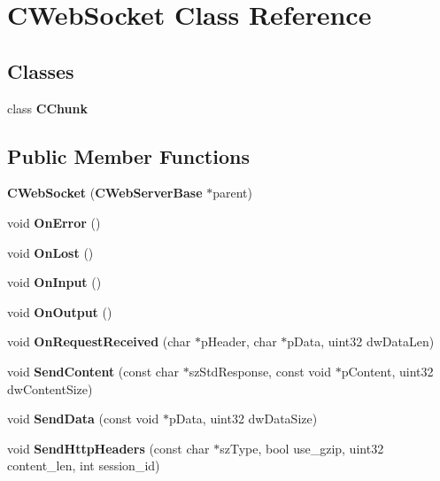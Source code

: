 \section{CWebSocket Class Reference}
\label{classCWebSocket}
\subsection*{Classes}
\begin{DoxyCompactItemize}
\item 
class {\bf CChunk}
\end{DoxyCompactItemize}
\subsection*{Public Member Functions}
\begin{DoxyCompactItemize}
\item 
{\bfseries CWebSocket} ({\bf CWebServerBase} $\ast$parent)\label{classCWebSocket_acd8404c5226d9b27dab23a135c4243f5}

\item 
void {\bfseries OnError} ()\label{classCWebSocket_ab73038c4726acfcc345212bc7897fddb}

\item 
void {\bfseries OnLost} ()\label{classCWebSocket_ac472512ad26dbc48c0d9673dc11c9265}

\item 
void {\bfseries OnInput} ()\label{classCWebSocket_a462b55451392bb593b64dfe224a47668}

\item 
void {\bfseries OnOutput} ()\label{classCWebSocket_a70bed226aa305e0a5b22bdeb209a72b2}

\item 
void {\bfseries OnRequestReceived} (char $\ast$pHeader, char $\ast$pData, uint32 dwDataLen)\label{classCWebSocket_a505ece47a7485c2d6bb8046600088aa1}

\item 
void {\bfseries SendContent} (const char $\ast$szStdResponse, const void $\ast$pContent, uint32 dwContentSize)\label{classCWebSocket_ae3cec98945778ad18592e38f3f1dd202}

\item 
void {\bfseries SendData} (const void $\ast$pData, uint32 dwDataSize)\label{classCWebSocket_aa8bd098a24f98deee61ce4e659a22a30}

\item 
void {\bfseries SendHttpHeaders} (const char $\ast$szType, bool use\_\-gzip, uint32 content\_\-len, int session\_\-id)\label{classCWebSocket_a410163059c8bb1d0f60288b19aaf7c6f}

\end{DoxyCompactItemize}
